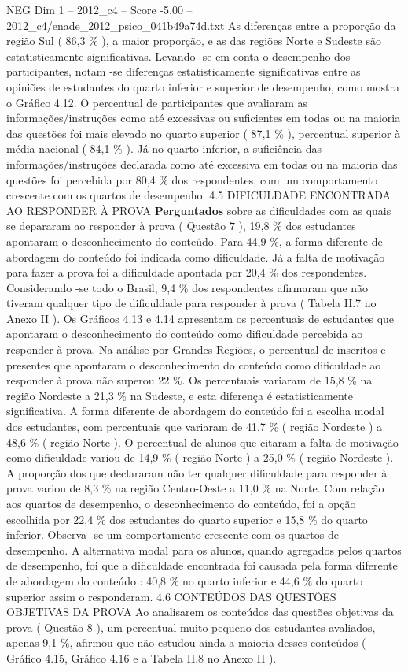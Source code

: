 \begin{textsample}{NEG Dim 1 – 2012\_c4 – Score -5.00 – 2012\_c4/enade\_2012\_psico\_041b49a74d.txt}
As diferenças entre a proporção da região Sul ( 86,3 \% ), a maior proporção, e as das regiões Norte e Sudeste são estatisticamente significativas.
Levando -se em conta o desempenho dos participantes, notam -se diferenças estatisticamente significativas entre as opiniões de estudantes do quarto inferior e superior de desempenho, como mostra o Gráfico 4.12.
O percentual de participantes que avaliaram as informações/instruções como até excessivas ou suficientes em todas ou na maioria das questões foi mais elevado no quarto superior ( 87,1 \% ), percentual superior à média nacional ( 84,1 \% ).
Já no quarto inferior, a suficiência das informações/instruções declarada como até excessiva em todas ou na maioria das questões foi percebida por 80,4 \% dos respondentes, com um comportamento crescente com os quartos de desempenho. 4.5 DIFICULDADE ENCONTRADA AO RESPONDER À PROVA \textbf{Perguntados} sobre as dificuldades com as quais se depararam ao responder à prova ( Questão 7 ), 19,8 \% dos estudantes apontaram o desconhecimento do conteúdo.
Para 44,9 \%, a forma diferente de abordagem do conteúdo foi indicada como dificuldade.
Já a falta de motivação para fazer a prova foi a dificuldade apontada por 20,4 \% dos respondentes.
Considerando -se todo o Brasil, 9,4 \% dos respondentes afirmaram que não tiveram qualquer tipo de dificuldade para responder à prova ( Tabela II.7 no Anexo II ).
Os Gráficos 4.13 e 4.14 apresentam os percentuais de estudantes que apontaram o desconhecimento do conteúdo como dificuldade percebida ao responder à prova.
Na análise por Grandes Regiões, o percentual de inscritos e presentes que apontaram o desconhecimento do conteúdo como dificuldade ao responder à prova não superou 22 \%.
Os percentuais variaram de 15,8 \% na região Nordeste a 21,3 \% na Sudeste, e esta diferença é estatisticamente significativa.
A forma diferente de abordagem do conteúdo foi a escolha modal dos estudantes, com percentuais que variaram de 41,7 \% ( região Nordeste ) a 48,6 \% ( região Norte ).
O percentual de alunos que citaram a falta de motivação como dificuldade variou de 14,9 \% ( região Norte ) a 25,0 \% ( região Nordeste ).
A proporção dos que declararam não ter qualquer dificuldade para responder à prova variou de 8,3 \% na região Centro-Oeste a 11,0 \% na Norte.
Com relação aos quartos de desempenho, o desconhecimento do conteúdo, foi a opção escolhida por 22,4 \% dos estudantes do quarto superior e 15,8 \% do quarto inferior.
Observa -se um comportamento crescente com os quartos de desempenho.
A alternativa modal para os alunos, quando agregados pelos quartos de desempenho, foi que a dificuldade encontrada foi causada pela forma diferente de abordagem do conteúdo : 40,8 \% no quarto inferior e 44,6 \% do quarto superior assim o responderam. 4.6 CONTEÚDOS DAS QUESTÕES OBJETIVAS DA PROVA Ao analisarem os conteúdos das questões objetivas da prova ( Questão 8 ), um percentual muito pequeno dos estudantes avaliados, apenas 9,1 \%, afirmou que não estudou ainda a maioria desses conteúdos ( Gráfico 4.15, Gráfico 4.16 e a Tabela II.8 no Anexo II ).

\end{textsample}

